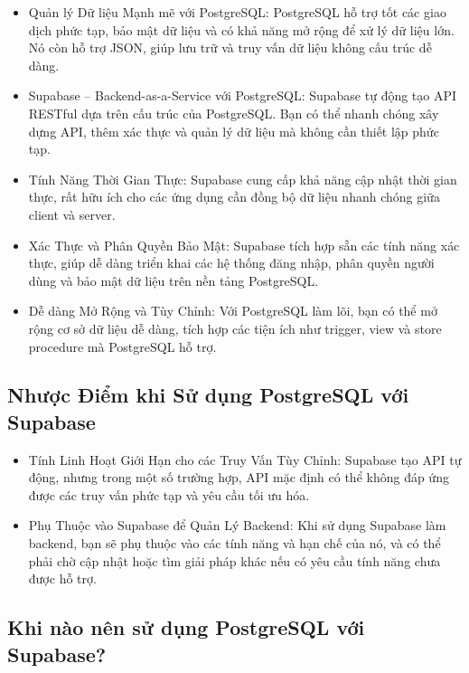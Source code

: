 \documentclass[a4paper]{report}
\begin{document}
\begin{itemize}
    \item Quản lý Dữ liệu Mạnh mẽ với PostgreSQL: PostgreSQL hỗ trợ tốt các giao dịch phức tạp, bảo mật dữ liệu và có khả năng mở rộng để xử lý dữ liệu lớn. Nó còn hỗ trợ JSON, giúp lưu trữ và truy vấn dữ liệu không cấu trúc dễ dàng.
    
    \item Supabase – Backend-as-a-Service với PostgreSQL: Supabase tự động tạo API RESTful dựa trên cấu trúc của PostgreSQL. Bạn có thể nhanh chóng xây dựng API, thêm xác thực và quản lý dữ liệu mà không cần thiết lập phức tạp.
    
    \item Tính Năng Thời Gian Thực: Supabase cung cấp khả năng cập nhật thời gian thực, rất hữu ích cho các ứng dụng cần đồng bộ dữ liệu nhanh chóng giữa client và server.
    
    \item Xác Thực và Phân Quyền Bảo Mật: Supabase tích hợp sẵn các tính năng xác thực, giúp dễ dàng triển khai các hệ thống đăng nhập, phân quyền người dùng và bảo mật dữ liệu trên nền tảng PostgreSQL.
    
    \item Dễ dàng Mở Rộng và Tùy Chỉnh: Với PostgreSQL làm lõi, bạn có thể mở rộng cơ sở dữ liệu dễ dàng, tích hợp các tiện ích như trigger, view và store procedure mà PostgreSQL hỗ trợ.
\end{itemize}

\subsection{Nhược Điểm khi Sử dụng PostgreSQL với Supabase}

\begin{itemize}
    \item Tính Linh Hoạt Giới Hạn cho các Truy Vấn Tùy Chỉnh: Supabase tạo API tự động, nhưng trong một số trường hợp, API mặc định có thể không đáp ứng được các truy vấn phức tạp và yêu cầu tối ưu hóa.
    
    \item Phụ Thuộc vào Supabase để Quản Lý Backend: Khi sử dụng Supabase làm backend, bạn sẽ phụ thuộc vào các tính năng và hạn chế của nó, và có thể phải chờ cập nhật hoặc tìm giải pháp khác nếu có yêu cầu tính năng chưa được hỗ trợ.
\end{itemize}

\subsection{Khi nào nên sử dụng PostgreSQL với Supabase?}
\end{document}

